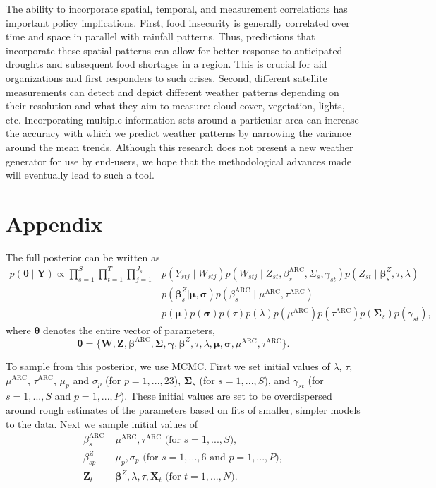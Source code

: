 \documentclass[11pt]{article}
\def\bbeta{\pmb{\beta}}
\def\bgamma{\pmb{\gamma}}
\def\bmu{\pmb{\mu}}
\def\bsigma{\pmb{\sigma}}
\def\bSigma{\pmb{\Sigma}}
\def\btheta{\pmb{\theta}}
\def\bX{\pmb{X}}
\def\bY{\pmb{Y}}
\def\bZ{\pmb{Z}}
\def\bW{\pmb{W}}
\begin{document}
The ability to incorporate spatial, temporal, and measurement correlations has important policy implications. First, food insecurity is generally correlated over time and space in parallel with rainfall patterns. Thus, predictions that incorporate these spatial patterns can allow for better response to anticipated droughts and subsequent food shortages in a region. This is crucial for aid organizations and first responders to such crises. Second, different satellite measurements can detect and depict different weather patterns depending on their resolution and what they aim to measure: cloud cover, vegetation, lights, etc. Incorporating multiple information sets around a particular area can increase the accuracy with which we predict weather patterns by narrowing the variance around the mean trends. Although this research does not present a new weather generator for use by end-users, we hope that the methodological advances made will eventually lead to such a tool. 




\newpage
\section{Appendix}\label{sec:appendix}

The full posterior can be written as
\begin{align*}
p(\btheta \mid \bY) \propto \prod_{s = 1}^S \prod_{t = 1}^T \prod_{j = 1}^{J_s} & p(Y_{stj} \mid W_{stj}) p(W_{stj} \mid Z_{st}, \beta_s^\text{ARC}, \Sigma_s, \gamma_{st}) p(Z_{st} \mid \bbeta_s^Z, \tau, \lambda) \\
& p(\bbeta_s^Z | \bmu, \bsigma) p(\beta_s^\text{ARC} \mid \mu^\text{ARC}, \tau^\text{ARC}) \\
& p(\bmu) p(\bsigma) p(\tau) p(\lambda) p(\mu^\text{ARC}) p(\tau^\text{ARC}) p(\bSigma_s) p(\gamma_{st}),
\end{align*}
where $\btheta$ denotes the entire vector of parameters, 
$$
\btheta = \{\bW, \bZ, \bbeta^\text{ARC}, \bSigma, \bgamma, \bbeta^Z, \tau, \lambda, \bmu, \bsigma, \mu^\text{ARC}, \tau^\text{ARC}\}.
$$

To sample from this posterior, we use MCMC. First we set initial values of $\lambda$, $\tau$, $\mu^\text{ARC}$, $\tau^\text{ARC}$, $\mu_p$ and $\sigma_p$ (for $p = 1, ..., 23$), $\bSigma_s$ (for $s = 1, ..., S$), and $\gamma_{st}$ (for $s = 1, ..., S$ and $p = 1, ..., P$). These initial values are set to be overdispersed around rough estimates of the parameters based on fits of smaller, simpler models to the data. Next we sample initial values of
\begin{align}
\beta_s^\text{ARC} &\mid \mu^\text{ARC}, \tau^\text{ARC}\text{ (for }s = 1, ..., S), \\
\beta^Z_{sp} &\mid \mu_p, \sigma_p\text{ (for }s = 1, ..., 6\text{ and }p = 1, ..., P), \\
\bZ_t &\mid \bbeta^Z, \lambda, \tau, \bX_t\text{ (for }t = 1, ..., N).
\end{align}
\end{document}
